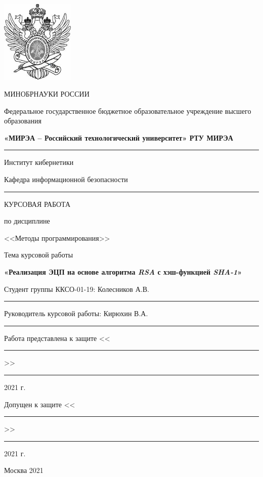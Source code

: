 \begin{center}
\thispagestyle{empty} 

\begin{spacing}{1}

\includegraphics[width=35mm]{img/logo.jpg} 

{

{МИНОБРНАУКИ РОССИИ}

{Федеральное государственное бюджетное образовательное \linebreak учреждение высшего образования}

{
{\bf «МИРЭА – Российский технологический университет» \linebreak РТУ МИРЭА}
}
\rule{1\columnwidth}{1pt}
{Институт кибернетики \smallskip}

{Кафедра информационной безопасности}
\rule{1\columnwidth}{1pt}

}

\end{spacing}

\vspace{1.5cm}

{
КУРСОВАЯ РАБОТА

по дисциплине

<<Методы программирования>>
}

\vspace{0.5cm}

{
Тема курсовой работы

\large\bf
«Реализация ЭЦП на основе алгоритма \emph{RSA} с хэш-функцией \emph{SHA-1}»
}

\vspace{1.5cm}

\begin{flushleft}
Студент группы ККСО-01-19: Колесников А.В. \rule{4cm}{0.5pt}

\vspace{1cm}

Руководитель курсовой работы: Кирюхин В.А. \rule{4cm}{0.5pt}

\vspace{1cm}

Работа представлена к защите <<\rule{1cm}{0.5pt}>> \rule{2cm}{0.5pt} 2021 г.

\vspace{1cm}

Допущен к защите <<\rule{1cm}{0.5pt}>> \rule{2cm}{0.5pt} 2021 г.
\end{flushleft}


\vspace{1.5cm}

{Москва 2021}

\end{center}